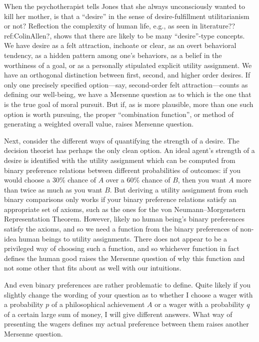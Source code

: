 When the psychotherapist tells Jones that she always unconsciously wanted to kill her mother, is that a ``desire''
in the sense of desire-fulfillment utilitarianism or not? Reflection the complexity of human life, e.g., as seen in literature??ref:ColinAllen?, shows that there are likely
to be many ``desire''-type concepts. We have desire as a felt attraction, inchoate or clear, as an overt behavioral
tendency, as a hidden pattern among one's behaviors, as a belief in the worthiness of a goal, or as a personally
stipulated explicit utility assignment. We have an orthogonal distinction between first, second, and higher order desires. 
If only one precisely specified option---say, second-order felt attraction---counts as defining our well-being, we
have a Mersenne question as to which is the one that is the true goal of moral pursuit. But if, as is more plausible, more
than one such option is worth pursuing, the proper ``combination function'', or method of generating a weighted
overall value, raises Mersenne question.

Next, consider the different ways of quantifying the strength of a desire. The decision theorist has perhaps the
only clean option. An ideal agent's strength of a desire is identified with the utility assignment which can be computed from binary
preference relations between different probabilities of outcomes: if you would choose a 30\% chance of $A$ over a
60\% chance of $B$, then you want $A$ more than twice as much as you want $B$. But deriving a utility assignment
from such binary comparisons only works if your binary preference relations satisfy an appropriate set of axioms,
such as the ones for the von Neumann--Morgenstern Representation Theorem. However, likely no human being's 
binary preferences satisfy the axioms, and so we need a function from the binary preferences
of non-idea human beings to utility assignments. There does not appear to be a privileged way of choosing such
a function, and so whichever function in fact defines the human good raises the Mersenne question of why this
function and not some other that fits about as well with our intuitions. 

And even binary preferences are rather problematic to define. Quite likely if you slightly change the wording
of your question as to whether I choose a wager with a probability $p$ of a philosophical achievement $A$ or 
a wager with a probability $q$ of a certain large sum of money, I will give different answers. What way of presenting
the wagers defines my actual preference between them raises another Mersenne question.

